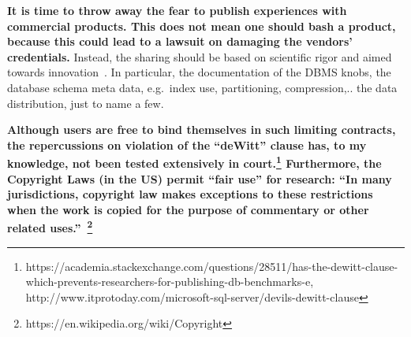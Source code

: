 \documentclass{cidr-2019}
\begin{document}
%
%
{\bf It is time to throw away the fear to publish experiences with
commercial products. This does not mean one should bash a product,
because this could lead to a lawsuit on damaging the vendors'
credentials.} Instead, the sharing should be based on scientific rigor
and aimed towards innovation~\cite{DBLP:conf/sigmod/RaasveldtHGM18}.
In particular, the documentation of the DBMS knobs, the database
schema meta data, e.g.\ index use, partitioning, compression,.. the
data distribution, just to name a few.


{\bf Although users are free to bind themselves in such limiting
  contracts, the repercussions on violation of the ``deWitt'' clause
  has, to my knowledge, not been tested extensively in
  court.\footnote{https://academia.stackexchange.com/questions/28511/has-the-dewitt-clause-which-prevents-researchers-for-publishing-db-benchmarks-e,
    http://www.itprotoday.com/microsoft-sql-server/devils-dewitt-clause}
  Furthermore, the Copyright Laws (in the US) permit ``fair use'' for
  research: ``In many jurisdictions, copyright law makes exceptions to
  these restrictions when the work is copied for the purpose of
  commentary or other related
  uses.''~\footnote{https://en.wikipedia.org/wiki/Copyright}}
\end{document}
